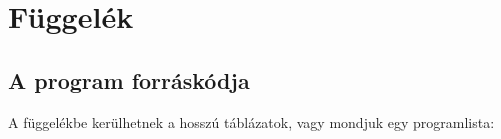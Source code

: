 \chapter{Függelék}

\section{A program forráskódja}
A függelékbe kerülhetnek a hosszú táblázatok, vagy mondjuk egy programlista:
